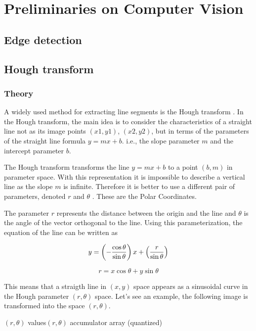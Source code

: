 \section{Preliminaries on Computer Vision}

\subsection{Edge detection}
\label{sec:edge}

\subsection{Hough transform}
\label{sec:prelimHough}
\subsubsection{Theory}
	A widely used method for extracting line segments is the Hough transform
	\cite{Hough}.
	In the Hough transform, the main idea is to consider the characteristics of a
	straight line not as its image points $(x1, y1)$, $(x2, y2)$, but in
	terms of the parameters of the straight line formula $y = mx + b$. i.e., the
	slope parameter $m$ and the intercept parameter $b$.


	The Hough transform transforms the line $y = mx + b$ 
	to a point $(b,m)$ in parameter space.
	With this representation it is impossible to describe a vertical line as 
	the slope $m$ is infinite.
	Therefore it is better to use a different pair of parameters, denoted $r$ and $\theta$ .  These are the Polar Coordinates.

	The parameter $r$ represents the distance between the origin and the line  and $\theta$ is the angle of the vector orthogonal to the line.
	Using this parameterization, the equation of the line can be written as

\[	    y = \left(-{\cos\theta\over\sin\theta}\right)x + \left({r\over{\sin\theta}}\right) \]

	\[r = x \cos \theta+y\sin \theta \]
	
	This means that a straigth line in $(x,y)$ space appears as a sinusoidal
	curve in the Hough parameter $(r,\theta)$ space.  Let's see an example, the
	following image is transformed into the space $(r,\theta)$.
	
	 {$(r, \theta)$ values}{$(r, \theta)$ accumulator array (quantized)}


